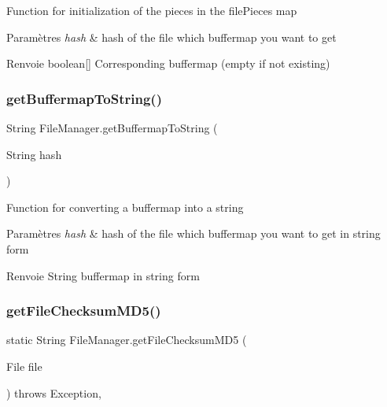 Function for initialization of the pieces in the file\+Pieces map


\begin{DoxyParams}{Paramètres}
{\em hash} & hash of the file which buffermap you want to get \\
\hline
\end{DoxyParams}
\begin{DoxyReturn}{Renvoie}
boolean\mbox{[}\mbox{]} Corresponding buffermap (empty if not existing) 
\end{DoxyReturn}
\mbox{\label{classFileManager_a2729300742a161f49b48d6ffac61d460}} 
\subsubsection{\texorpdfstring{get\+Buffermap\+To\+String()}{getBuffermapToString()}}
{\footnotesize\ttfamily String File\+Manager.\+get\+Buffermap\+To\+String (\begin{DoxyParamCaption}\item[{String}]{hash }\end{DoxyParamCaption})\hspace{0.3cm}{\ttfamily [inline]}}

Function for converting a buffermap into a string


\begin{DoxyParams}{Paramètres}
{\em hash} & hash of the file which buffermap you want to get in string form \\
\hline
\end{DoxyParams}
\begin{DoxyReturn}{Renvoie}
String buffermap in string form 
\end{DoxyReturn}
\mbox{\label{classFileManager_adf5dffefb9d9ab0f3e6aab03382375c3}} 
\subsubsection{\texorpdfstring{get\+File\+Checksum\+M\+D5()}{getFileChecksumMD5()}}
{\footnotesize\ttfamily static String File\+Manager.\+get\+File\+Checksum\+M\+D5 (\begin{DoxyParamCaption}\item[{File}]{file }\end{DoxyParamCaption}) throws Exception\hspace{0.3cm}{\ttfamily [inline]}, {\ttfamily [static]}}

